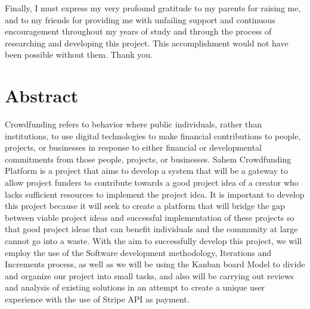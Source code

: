 Finally, I must express my very profound gratitude to my parents for raising me, and to my friends
for providing me with unfailing support and continuous encouragement throughout my years
of study and through the process of researching and developing this project.
This accomplishment would not have been possible without them. Thank you.

\cleardoublepage%
\chapter*{Abstract}
\thispagestyle{empty}
Crowdfunding refers to behavior where public individuals, rather than institutions, to use digital
technologies to make financial contributions to people, projects, or businesses in response to
either financial or developmental commitments from those people, projects, or businesses.
Sahem Crowdfunding Platform is a project that aims to develop a system that will be a gateway to allow project funders to
contribute towards a good project idea of a creator who lacks sufficient resources to implement
the project idea. It is important to develop this project because it will seek to create a platform
that will bridge the gap between viable project ideas and successful implementation of these
projects so that good project ideas that can benefit individuals and the community at large cannot
go into a waste.
With the aim to successfully develop this project, we will employ the use of the Software
development methodology, Iterations and Increments process, as well as we will be using the Kanban board Model
to divide and organize our project into small tasks, and also will be carrying out reviews and analysis of existing solutions in an attempt to
create a unique user experience with the use of Stripe API as payment.